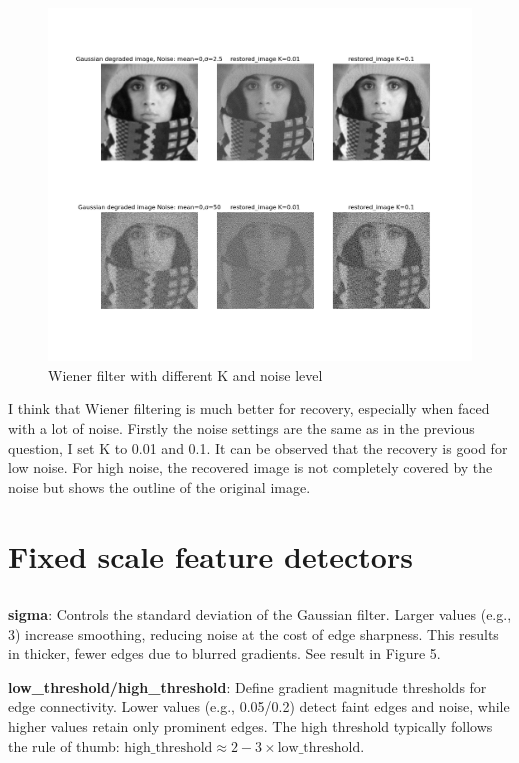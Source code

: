 \documentclass[12pt]{article}
\begin{document}
\begin{figure}[h]
    \centering
    \includegraphics[width=1\textwidth]{pics/a5_2.3.png} 
    \caption{Wiener filter with different K and noise level}
\end{figure}
I think that Wiener filtering is much better for recovery, especially when faced with a lot of noise. Firstly the noise settings are the same as in the previous question, I set K to 0.01 and 0.1.
It can be observed that the recovery is good for low noise. For high noise, the recovered image is not completely covered by the noise but shows the outline of the original image.

\section{Fixed scale feature detectors}
\subsection{}

\textbf{sigma}: Controls the standard deviation of the Gaussian filter. Larger values (e.g., 3) increase smoothing, reducing noise at the cost of edge sharpness. This results in thicker, fewer edges due to blurred gradients. See result in Figure 5.

\textbf{low\_threshold/high\_threshold}: Define gradient magnitude thresholds for edge connectivity. Lower values (e.g., 0.05/0.2) detect faint edges and noise, while higher values retain only prominent edges. The high threshold typically follows the rule of thumb: \( \text{high\_threshold} \approx 2-3 \times \text{low\_threshold} \).
\end{document}

